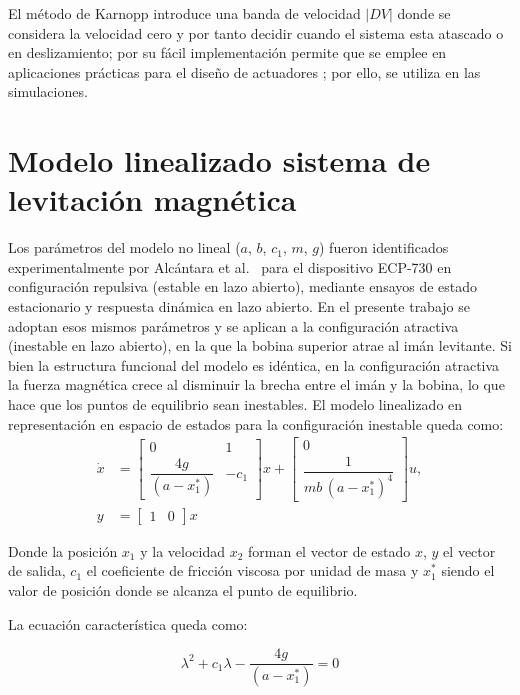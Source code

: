 El método de Karnopp\cite{karnopp} introduce una banda de velocidad $\left| DV \right|$ donde se considera la velocidad cero y por tanto decidir cuando el sistema esta atascado o en deslizamiento; por su fácil implementación
permite que se emplee en aplicaciones prácticas para el diseño de actuadores \cite{liu}\cite{ravanbod}\cite{ravanbod1}\cite{bicakci}\cite{romano}; por ello, se utiliza en las simulaciones.

\section{Modelo linealizado sistema de levitación magnética}
Los parámetros del modelo no lineal ($a$, $b$, $c_1$, $m$, $g$) fueron identificados experimentalmente por Alcántara et al.\ \cite{diana_tesis} para el dispositivo ECP-730 en configuración repulsiva (estable en lazo abierto), mediante ensayos de estado estacionario y respuesta dinámica en lazo abierto. En el presente trabajo se adoptan esos mismos parámetros y se aplican a la configuración atractiva (inestable en lazo abierto), en la que la bobina superior atrae al imán levitante. Si bien la estructura funcional del modelo es idéntica, en la configuración atractiva la fuerza magnética crece al disminuir la brecha entre el imán y la bobina, lo que hace que los puntos de equilibrio sean inestables. El modelo linealizado en representación en espacio de estados para la configuración inestable queda como:
\[
\begin{aligned}
\dot{x}
&=
\begin{bmatrix}
0 & 1 \\[6pt]
\dfrac{4g}{(a-x_1^{\ast})} & -c_1
\end{bmatrix}x
+
\begin{bmatrix}
0 \\[6pt]
\dfrac{1}{mb\,(a-x_1^{\ast})^4}
\end{bmatrix}u,
\\[10pt]
y &= \begin{bmatrix} 1 & 0 \end{bmatrix} x
\end{aligned}
\]


Donde la posición $x_1$ y la velocidad $x_2$ forman el vector de estado $x$, $y$ el vector de salida, $c_1$ el coeficiente de fricción viscosa por unidad de masa y $x_1^{\ast}$ siendo el valor de posición donde se alcanza el punto de equilibrio.

La ecuación característica queda como:

\[
\lambda^2 + c_1\lambda - \dfrac{4g}{(a-x_1^{\ast})} = 0
\]

